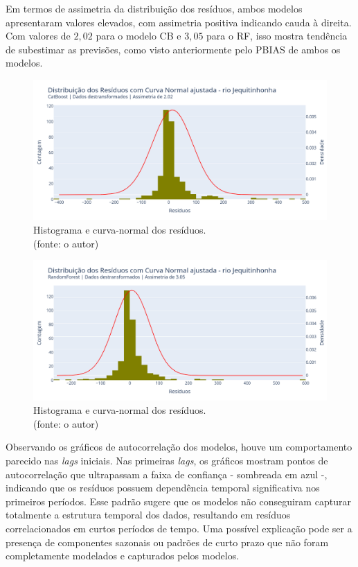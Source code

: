 Em termos de assimetria da distribuição dos resíduos, ambos modelos apresentaram valores elevados, com assimetria positiva indicando cauda à direita. Com valores de $2,02$ para o modelo CB e $3,05$ para o RF, isso mostra tendência de subestimar as previsões, como visto anteriormente pelo PBIAS de ambos os modelos.

\begin{figure}[!h]
	\centering
	\includegraphics[scale=0.33]{Figuras/jequiti/wfv/CB/CB_WFV_LOG_RESID_x_CURVA_NORMAL.png}
	\caption{Histograma e curva-normal dos resíduos.\\(fonte: o autor)}
	\label{fig:jequiti_CB_WFV_LOG_RESID_x_CURVA_NORMAL}
\end{figure}

\begin{figure}[!h]
	\centering
	\includegraphics[scale=0.33]{Figuras/jequiti/wfv/RF/RF_WFV_LOG_RESID_x_CURVA_NORMAL.png}
	\caption{Histograma e curva-normal dos resíduos.\\(fonte: o autor)}
	\label{fig:jequiti_RF_WFV_LOG_RESID_x_CURVA_NORMAL}
\end{figure}
\clearpage

Observando os gráficos de autocorrelação dos modelos, houve um comportamento parecido nas \textit{lags} iniciais. Nas primeiras \textit{lags}, os gráficos mostram pontos de autocorrelação que ultrapassam a faixa de confiança - sombreada em azul -, indicando que os resíduos possuem dependência temporal significativa nos primeiros períodos. Esse padrão sugere que os modelos não conseguiram capturar totalmente a estrutura temporal dos dados, resultando em resíduos correlacionados em curtos períodos de tempo. Uma possível explicação pode ser a presença de componentes sazonais ou padrões de curto prazo que não foram completamente modelados e capturados pelos modelos.


